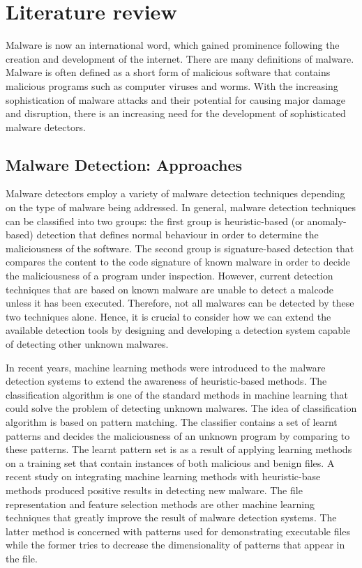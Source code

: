 \section{Literature review}

Malware is now an international word, which gained prominence following the
creation and development of the internet. There are many definitions of
malware. Malware is often defined as a short form of malicious software that
contains malicious programs such as computer viruses and worms. With the
increasing sophistication of malware attacks and their potential for causing
major damage and disruption, there is an increasing need for the development of
sophisticated malware detectors\cite{Malware-tech}.

\subsection{Malware Detection: Approaches}

Malware detectors employ a variety of malware detection techniques depending on
the type of malware being addressed. In general, malware detection techniques
can be classified into two groups: the first group is heuristic-based (or
anomaly-based) detection that defines normal behaviour in order to determine
the maliciousness of the software. The second group is signature-based
detection that compares the content to the code signature of known malware in
order to decide the maliciousness of a program under inspection. However,
current detection techniques that are based on known malware are unable to
detect a malcode unless it has been executed. Therefore, not all malwares can
be detected by these two techniques alone. Hence, it is crucial to consider how
we can extend the available detection tools by designing and developing a
detection system capable of detecting other unknown
malwares\cite{Malware-tech}.
 

In recent years, machine learning methods were introduced to the malware
detection systems to extend the awareness of heuristic-based methods. The
classification algorithm is one of the standard methods in machine learning
that could solve the problem of detecting unknown malwares\cite{Machin-lear}.
The idea of classification algorithm is based on pattern matching. The
classifier contains a set of learnt patterns and decides the maliciousness of
an unknown program by comparing to these patterns. The learnt pattern set is as
a result of applying learning methods on a training set that contain instances
of both malicious and benign files. A recent study on integrating machine
learning methods with heuristic-base methods produced positive results in
detecting new malware\cite{Machin-lear}.  The file representation and feature
selection methods are other machine learning techniques that greatly improve
the result of malware detection systems. The latter method is concerned with
patterns used for demonstrating executable files while the former tries to
decrease the dimensionality of patterns that appear in the
file\cite{Machin-lear}.


